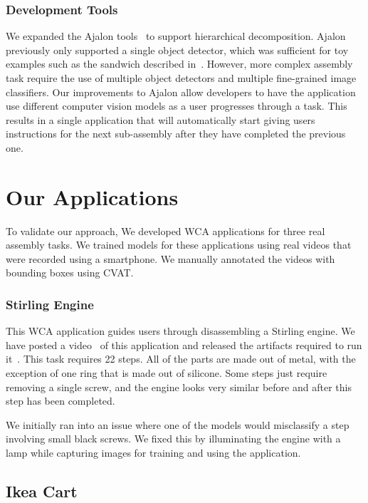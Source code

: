 \subsubsection{Development Tools}

We expanded the Ajalon tools~\cite{pham2021ajalon} to support hierarchical
decomposition.
Ajalon previously only supported a single object detector, which was sufficient
for toy examples such as the sandwich described in~\cite{chen2017}.
However, more complex assembly task require the use of multiple object detectors
and multiple fine-grained image classifiers.
Our improvements to Ajalon allow developers to have the application use
different computer vision models as a user progresses through a task.
This results in a single application that will automatically start
giving users instructions for the next sub-assembly after they have completed
the previous one.

\section{Our Applications}

To validate our approach, We developed WCA applications for three real assembly
tasks.
We trained models for these applications using real videos that were recorded
using a smartphone.
We manually annotated the videos with bounding boxes using CVAT.

\subsubsection{Stirling Engine}\label{sec:stirling}

This WCA application guides users through disassembling a
Stirling engine.
We have posted a video~\cite{stirling_youtube} of this application and released
the artifacts required to run it~\cite{stirling_github}.
This task requires 22 steps. All of the parts are made out of
metal, with the exception of one ring that is made out of silicone. Some steps
just require removing a single screw, and the engine looks very similar before
and after this step has been completed.

We initially ran into an issue where one of the models would misclassify a step
involving small black screws.
We fixed this by illuminating the engine with a lamp while capturing images for
training and using the application.

\subsection{Ikea Cart}

